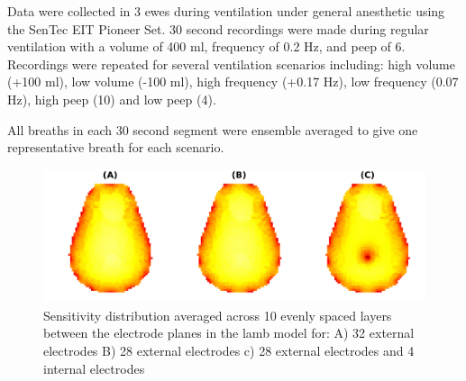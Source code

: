 Data were collected in 3 ewes during ventilation 
under general anesthetic using the
SenTec EIT Pioneer Set.
30 second recordings were
made during regular ventilation with a volume of 
400  ml, frequency of 0.2  Hz, and peep of 6.
Recordings were repeated for several 
ventilation scenarios including: high volume (+100 ml),
low volume (-100 ml), 
high frequency (+0.17 Hz), 
low frequency (0.07 Hz), 
high peep (10) and low peep (4). 

All breaths in each 30 second segment were 
ensemble averaged to 
give one representative breath for each scenario.
\begin{figure}
\centering
\includegraphics[width=\columnwidth]{chapter6-internal_electrodes/imgs/lamb_sensitivity_profiles.pdf}
\caption[Sensitivity distribution in a lamb model]{\label{fig:sens_example}%
Sensitivity distribution averaged across 10 evenly spaced layers
between the electrode planes in the lamb model for: 
A) 32 external electrodes 
B) 28 external electrodes 
c) 28 external electrodes and 4 internal electrodes
}
\label{fig:sens_example}
\end{figure}

